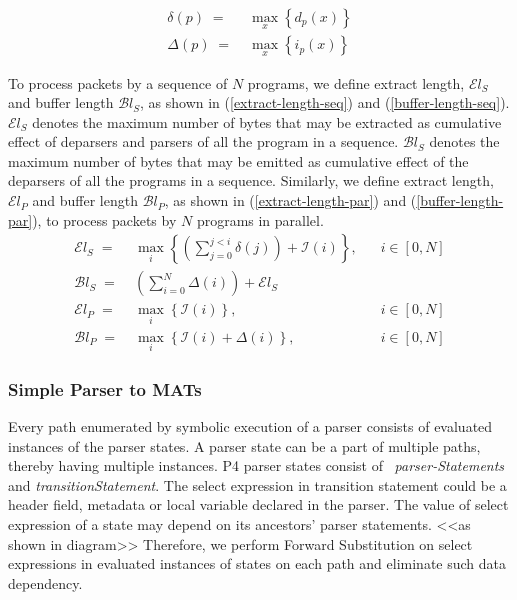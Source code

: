 \documentclass{hotnets19}
\begin{document}
\begin{align}
\delta(p)\; =& \;  \max_{x} \left\{ d_{p}(x) \right\} \label{decrease} \\
\Delta(p) \; =& \; \max_{x} \left\{ i_{p}(x) \right\} \label{increase}
\end{align}

To process packets by a sequence of $N$ programs, we define extract length, $\mathcal{E}l_{S}$ and buffer length $\mathcal{B}l_{S}$, as shown in (\ref{extract-length-seq}) and (\ref{buffer-length-seq}).
$\mathcal{E}l_{S}$ denotes the maximum number of bytes that may be extracted as cumulative effect of deparsers and parsers of all the program in a sequence.
$\mathcal{B}l_{S}$ denotes the maximum number of bytes that may be emitted as cumulative effect of the deparsers of all the programs in a sequence.
Similarly, we define extract length, $\mathcal{E}l_{P}$ and buffer length $\mathcal{B}l_{P}$, as shown in (\ref{extract-length-par}) and (\ref{buffer-length-par}), to process packets by $N$ programs in parallel.
\begin{align}
\mathcal{E}l_{S} \; =& \; \max_{i} \left\{ \left( \sum_{j=0}^{j<i} \delta(j) \right)+ \mathcal{I}(i) \right\},&\;\;\;i  \in [0,N] \label{extract-length-seq} \\
\mathcal{B}l_{S} \; =& \; \left( \sum_{i=0}^{N} \Delta(i) \right)+ \mathcal{E}l_{S} & \label{buffer-length-seq} \\
\mathcal{E}l_{P} \; =& \; \max_{i} \left\{ \mathcal{I}(i) \right\},&\;\;\;i  \in [0,N] \label{extract-length-par} \\
\mathcal{B}l_{P} \; =& \; \max_{i} \left\{ \mathcal{I}(i) + \Delta(i) \right\},&\;\;\;i  \in [0,N]  \label{buffer-length-par}
\end{align}


\subsubsection{Simple Parser to MATs}
\label{subsubsection:simple-parser-to-mats}
Every path enumerated by symbolic execution of a parser consists of evaluated instances of the parser states.
A parser state can be a part of multiple paths, thereby having multiple instances.
P4 parser states consist of ~\emph{parser-Statements}  and \emph{transition\-Statement}.
The select expression in transition statement could be a header field, metadata or local variable declared in the parser.
The value of select expression of a state may depend on its ancestors' parser statements. <<as shown in diagram>>
Therefore, we perform Forward Substitution on select expressions in evaluated instances of states
on each path and eliminate such data dependency.
\end{document}
